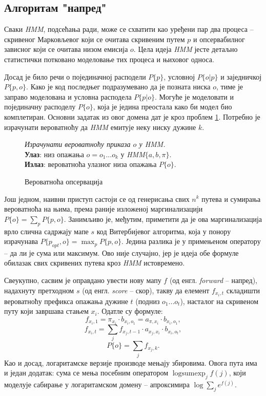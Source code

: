 \documentclass[12pt,oneside]{memoir}
\newenvironment{problem}[1][!ht]
{\renewcommand{\algorithmcfname}{Проблем}
\begin{figure}[!ht]
\centering
  \begin{minipage}{.94\linewidth}
	\begin{algorithm}[#1]%
  }{\end{algorithm}
  \end{minipage}
\end{figure}}
\begin{document}
\begin{CJK}{UTF8}{ipxm}
\section{Алгоритам "напред"}
Сваки \textit{HMM}, подсећања ради, може се схватити као уређени пар два процеса -- скривеног Марковљевог који се очитава скривеним путем $p$ и опсервабилног зависног који се очитава низом емисија $o$. Цела идеја \textit{HMM} јесте детаљно статистички потковано моделовање тих процеса и њиховог односа.

Досад је било речи о појединачној расподели $P\{p\}$, условној $P\{o | p\}$ и заједничкој $P\{p, o\}$. Како је код последњег подразумевано да је позната ниска $o$, тиме је заправо моделована и условна расподела $P\{p | o\}$. Могуће је моделовати и појединачну расподелу $P\{o\}$, која је једина преостала како би модел био комплетиран. Основни задатак из овог домена дат је кроз проблем \ref{prob:ops}. Потребно је израчунати вероватноћу да \textit{HMM} емитује неку ниску дужине $k$.

\begin{problem}[H]
  \SetAlgoLined
  \textit{Израчунати вероватноћу приказа $o$ у \textit{HMM}.}\\
  \textbf{Улаз}: низ опажања $o = o_1...o_k$ у \textit{HMM}$\{a, b, \pi\}$.\\
  \textbf{Излаз}: вероватноћа улазног низа опажања $P\{o\}$.
  \caption{Вероватноћа опсервација\cite{ba10d}}
  \label{prob:ops}
\end{problem}

Још једном, наивни приступ састоји се од генерисања свих $n^k$ путева и сумирања вероватноћа на њима, према раније изложеној маргинализацији $P\{o\} = \sum_p P\{p, o\}$. Занимљиво је, међутим, приметити да је ова маргинализација врло слична садржају мапе $s$ код Витербијевог алгоритма, која у понору израчунава $P\{p_{opt}, o\} = \max_p P\{p, o\}$. Једина разлика је у примењеном оператору -- да ли је сума или максимум. Ово није случајно, јер је идеја обе формуле обилазак свих скривених путева кроз \textit{HMM} истовремено.

Свеукупно, сасвим је оправдано увести нову мапу $f$ (од енгл. \textit{forward} -- напред), надахнуту претходном $s$ (од енгл. \textit{score} -- скор), такву да елемент $f_{x_i, t}$ складишти вероватноћу префикса опажања дужине $t$ (подниз $o_1...o_t$), насталог на скривеном путу који завршава стањем $x_i$. Одатле су формуле: $$f_{x_i, 1} = \pi_{x_i} \cdot b_{x_i, o_1} = a_{\pi, x_i} \cdot b_{x_i, o_1},$$ $$f_{x_i, t} = \sum_j f_{x_j, t-1} \cdot a_{x_j, x_i} \cdot b_{x_i, o_t},$$ $$P\{o\} = \sum_j f_{x_j, k}.$$ Као и досад, логаритамске верзије производе мењају збировима. Овога пута има и један додатак: сума се мења посебним оператором $\operatorname{logsumexp}_j f(j)$, који моделује сабирање у логаритамском домену -- апроксимира $\log \sum_j e^{f(j)}$.


\end{CJK}
\end{document}
